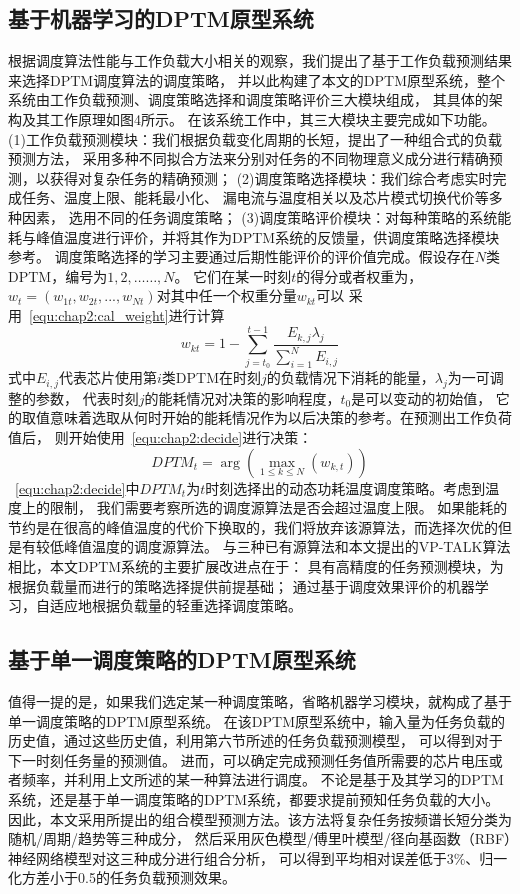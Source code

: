 \subsection{基于机器学习的DPTM原型系统}
根据调度算法性能与工作负载大小相关的观察，我们提出了基于工作负载预测结果来选择DPTM调度算法的调度策略， 并以此构建了本文的DPTM原型系统，整个系统由工作负载预测、调度策略选择和调度策略评价三大模块组成， 其具体的架构及其工作原理如图4所示。
在该系统工作中，其三大模块主要完成如下功能。 (1)工作负载预测模块：我们根据负载变化周期的长短，提出了一种组合式的负载预测方法， 采用多种不同拟合方法来分别对任务的不同物理意义成分进行精确预测，以获得对复杂任务的精确预测； (2)调度策略选择模块：我们综合考虑实时完成任务、温度上限、能耗最小化、 漏电流与温度相关以及芯片模式切换代价等多种因素， 选用不同的任务调度策略； (3)调度策略评价模块：对每种策略的系统能耗与峰值温度进行评价，并将其作为DPTM系统的反馈量，供调度策略选择模块参考。
调度策略选择的学习主要通过后期性能评价的评价值完成。假设存在$N$类DPTM，编号为$1,2,……,N$。 它们在某一时刻$t$的得分或者权重为，$w_t=(w_{1t},w_{2t},...,w_{Nt})$对其中任一个权重分量$w_{kt}$可以 采用~\ref{equ:chap2:cal_weight}进行计算
\begin{equation}
\label{equ:chap2:cal_weight}
w_{kt} = 1- \sum\limits_{j=t_0}^{t-1} \frac{E_{k,j}\lambda_j}{\sum\limits_{i=1}^N E_{i,j}}
\end{equation}
式中$E_{i,j}$代表芯片使用第$i$类DPTM在时刻$j$的负载情况下消耗的能量，$\lambda_{j}$为一可调整的参数， 代表时刻$j$的能耗情况对决策的影响程度，$t_0$是可以变动的初始值， 它的取值意味着选取从何时开始的能耗情况作为以后决策的参考。在预测出工作负荷值后， 则开始使用~\ref{equ:chap2:decide}进行决策：
\begin{equation}
\label{equ:chap2:decide}
DPTM_t = \arg(\max\limits_{1\le k \le N}(w_{k,t}))
\end{equation}
~\ref{equ:chap2:decide}中$DPTM_t$为$t$时刻选择出的动态功耗温度调度策略。考虑到温度上的限制， 我们需要考察所选的调度源算法是否会超过温度上限。 如果能耗的节约是在很高的峰值温度的代价下换取的，我们将放弃该源算法，而选择次优的但是有较低峰值温度的调度源算法。
与三种已有源算法和本文提出的VP-TALK算法相比，本文DPTM系统的主要扩展改进点在于： 具有高精度的任务预测模块，为根据负载量而进行的策略选择提供前提基础； 通过基于调度效果评价的机器学习，自适应地根据负载量的轻重选择调度策略。

\subsection{基于单一调度策略的DPTM原型系统}
值得一提的是，如果我们选定某一种调度策略，省略机器学习模块，就构成了基于单一调度策略的DPTM原型系统。 在该DPTM原型系统中，输入量为任务负载的历史值，通过这些历史值，利用第六节所述的任务负载预测模型， 可以得到对于下一时刻任务量的预测值。 进而，可以确定完成预测任务值所需要的芯片电压或者频率，并利用上文所述的某一种算法进行调度。
不论是基于及其学习的DPTM系统，还是基于单一调度策略的DPTM系统，都要求提前预知任务负载的大小。 因此，本文采用所提出的组合模型预测方法。该方法将复杂任务按频谱长短分类为随机/周期/趋势等三种成分， 然后采用灰色模型/傅里叶模型/径向基函数（RBF）神经网络模型对这三种成分进行组合分析， 可以得到平均相对误差低于3\%、归一化方差小于0.5的任务负载预测效果。 